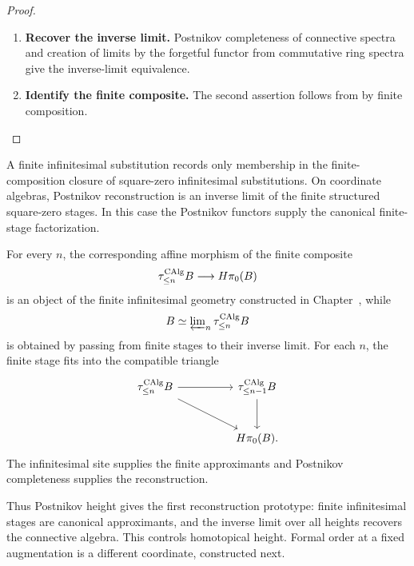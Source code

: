 \begin{proof}
\leavevmode
\begin{enumerate}[label=\textup{(\arabic*)}]
    \item \textbf{Recover the inverse limit.}
    Postnikov completeness of connective spectra and creation of limits by the
    forgetful functor from commutative ring spectra give the inverse-limit
    equivalence.
    \item \textbf{Identify the finite composite.}
    The second assertion follows from
     by finite composition.
\end{enumerate}
\end{proof}

\begin{remark}
\label{rem:postnikov-finite-complete}
A finite infinitesimal substitution records only membership in the
finite-composition closure of square-zero infinitesimal substitutions. On
coordinate algebras, Postnikov reconstruction is an inverse limit of the
finite structured square-zero stages. In this case the Postnikov functors
supply the canonical finite-stage factorization.
\end{remark}

\begin{remark}
\label{rem:postnikov-reconstruction-doctrinal}
For every \(n\), the corresponding affine morphism of the finite composite
\[
    \tau_{\leq n}^{\operatorname{CAlg}}B\longrightarrow H\pi_0(B)
\]
is an object of the finite infinitesimal geometry constructed in
Chapter~, while
\[
    B\simeq\varprojlim\nolimits_n\tau_{\leq n}^{\operatorname{CAlg}}B
\]
is obtained by passing from finite stages to their inverse limit.
For each \(n\), the finite stage fits into the compatible triangle
\[
\begin{tikzcd}[column sep=huge,row sep=large]
    \tau_{\leq n}^{\CAlg}B
        \arrow[r]
        \arrow[dr]
        &
    \tau_{\leq n-1}^{\CAlg}B
        \arrow[d]
    \\
        &
    H\pi_0(B).
\end{tikzcd}
\]
  The
infinitesimal site supplies the finite approximants and Postnikov completeness
supplies the reconstruction.
\end{remark}


Thus Postnikov height gives the first reconstruction prototype: finite infinitesimal
stages are canonical approximants, and the inverse limit over all heights recovers the
connective algebra. This controls homotopical height. Formal order at a fixed
augmentation is a different coordinate, constructed next.

